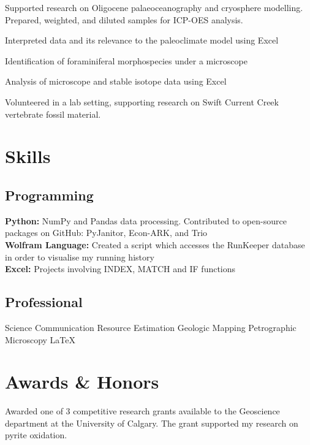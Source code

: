 \documentclass[]{deedy-resume-openfont}
\begin{document}
Supported research on Oligocene palaeoceanography and cryosphere modelling. Prepared, weighted, and diluted samples for ICP-OES analysis. 
\begin{tightemize}
\item Interpreted data and its relevance to the paleoclimate model using Excel
\item Identification of foraminiferal morphospecies under a microscope \item Analysis of microscope and stable isotope data using Excel 
\end{tightemize}
\sectionsep

Volunteered in a lab setting, supporting research on Swift Current Creek vertebrate fossil material.
\sectionsep


%
%
\section{Skills} 

\subsection{Programming}

\textbf{Python:} NumPy and Pandas data processing. Contributed to open-source packages on GitHub: PyJanitor, Econ-ARK, and Trio \\
\textbf{Wolfram Language:} Created a script which accesses the RunKeeper database in order to visualise my running history \\
\textbf{Excel:} Projects involving INDEX, MATCH and IF functions 
\sectionsep


\subsection{Professional}
Science Communication \textbullet{} Resource Estimation \textbullet{} Geologic Mapping \textbullet{} Petrographic Microscopy  \textbullet{}  \LaTeX 
\sectionsep


\section{Awards \& Honors} 
\descript{}
Awarded one of 3 competitive research grants available to the Geoscience department at the University of Calgary. The grant supported my research on pyrite oxidation.
\sectionsep
\end{document}
